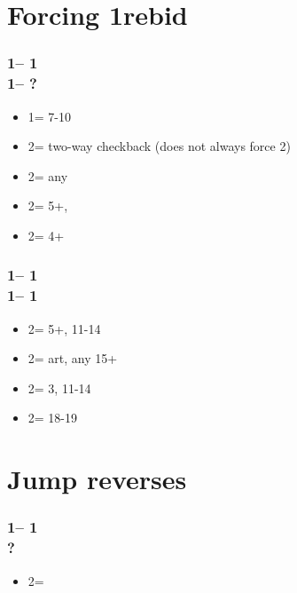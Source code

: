 \documentclass[12pt, a4paper]{report}
\begin{document}
\section*{\colorbox{blue!30}{Forcing 1\spades rebid}}

\subsubsection*{1\clubs -- 1\hearts\\
                1\spades -- ?}
\begin{itemize}
    \item 1\nt = 7-10 \bal
    \item 2\clubs = two-way checkback (does not always force 2\diams)
    \item 2\diams = any \gf
    \item 2\hearts = 5+\hearts, \nf
    \item 2\spades = 4+\spades
\end{itemize}

\subsubsection*{1\clubs -- 1\hearts\\
                1\spades -- 1\nt\\}
\begin{itemize}
    \item 2\clubs = 5+\clubs, 11-14
    \item 2\diams = art, any 15+ \unbal
    \item 2\hearts = 3\hearts, 11-14
    \item 2\nt = 18-19 \bal\ \gf
\end{itemize}

\section*{\colorbox{blue!30}{Jump reverses}}

\subsubsection*{1\clubs -- 1\hearts\\
                ?}
\begin{itemize}
    \item 2\spades = \clubs\ \gf
\end{itemize}
\end{document}
